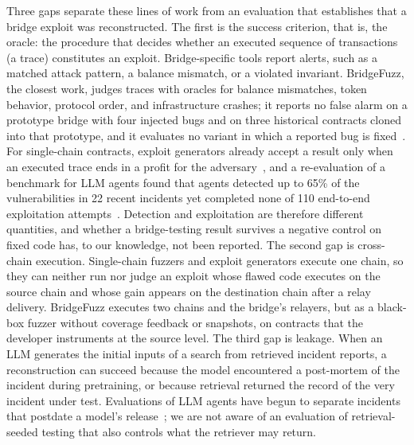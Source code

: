 \documentclass[a4paper]{cas-sc}
\begin{document}
Three gaps separate these lines of work from an evaluation that establishes that a bridge exploit was reconstructed. The first is the success criterion, that is, the oracle: the procedure that decides whether an executed sequence of transactions (a trace) constitutes an exploit. Bridge-specific tools report alerts, such as a matched attack pattern, a balance mismatch, or a violated invariant. BridgeFuzz, the closest work, judges traces with oracles for balance mismatches, token behavior, protocol order, and infrastructure crashes; it reports no false alarm on a prototype bridge with four injected bugs and on three historical contracts cloned into that prototype, and it evaluates no variant in which a reported bug is fixed~\citep{winkler2026bridgefuzz}. For single-chain contracts, exploit generators already accept a result only when an executed trace ends in a profit for the adversary~\citep{gervais2025a1, zhang2026v2e}, and a re-evaluation of a benchmark for LLM agents found that agents detected up to 65\% of the vulnerabilities in 22 recent incidents yet completed none of 110 end-to-end exploitation attempts~\citep{peng2026reevmbench}. Detection and exploitation are therefore different quantities, and whether a bridge-testing result survives a negative control on fixed code has, to our knowledge, not been reported. The second gap is cross-chain execution. Single-chain fuzzers and exploit generators execute one chain, so they can neither run nor judge an exploit whose flawed code executes on the source chain and whose gain appears on the destination chain after a relay delivery. BridgeFuzz executes two chains and the bridge's relayers, but as a black-box fuzzer without coverage feedback or snapshots, on contracts that the developer instruments at the source level. The third gap is leakage. When an LLM generates the initial inputs of a search from retrieved incident reports, a reconstruction can succeed because the model encountered a post-mortem of the incident during pretraining, or because retrieval returned the record of the very incident under test. Evaluations of LLM agents have begun to separate incidents that postdate a model's release~\citep{peng2026reevmbench}; we are not aware of an evaluation of retrieval-seeded testing that also controls what the retriever may return.
\end{document}
